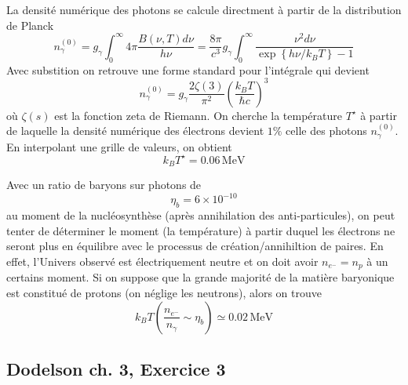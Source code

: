 \documentclass{article}
\numberwithin{equation}{section}
\begin{document}
La densité numérique des photons se calcule directment à partir de la distribution 
de Planck
\begin{equation}\label{eq:PlanckDensity} 
        n_\gamma^{(0)} = g_\gamma\int_0^{\infty}4\pi\frac{B(\nu, T) d\nu}{h\nu} = 
        \frac{8 \pi }{c^3} g_\gamma \int_0^{\infty } 
        \frac{\nu^2 d\nu}{\exp \left\{ h\nu / k_B T \right\} - 1}
\end{equation} 
Avec substition on retrouve une forme standard pour l'intégrale qui devient
\[
        n_\gamma^{(0)} = g_\gamma\frac{2\zeta(3 )}{\pi^2} \left( \frac{k_B T}{\hbar c} \right)^{3}
\]
où $\zeta(s)$ est la fonction zeta de Riemann.
On cherche la température $T^\star$ à partir de laquelle la densité numérique des électrons 
devient $1\%$ celle des photons $n_\gamma^{(0)}$. En interpolant une grille de valeurs, 
on obtient
\[
        \boxed{k_BT^\star = 0.06\, \text{MeV}}
\]

Avec un ratio de baryons sur photons de
\[
        \eta_b = 6 \times 10^{-10}
\]
au moment de la nucléosynthèse (après annihilation des anti-particules), on peut 
tenter de déterminer le moment (la température) à partir duquel les électrons 
ne seront plus en équilibre avec le processus de création/annihiltion de paires. En 
effet, l'Univers observé est électriquement neutre et on doit avoir $n_{e^{-}} = n_p$ 
à un certains moment. Si on suppose que la grande majorité de la matière baryonique 
est constitué de protons (on néglige les neutrons), alors on trouve
\[
        \boxed{k_B T( \frac{n_{e^{-}}}{n_\gamma} \sim \eta_b) \simeq 0.02\, \text{MeV}}
\]

\subsection{Dodelson ch. 3, Exercice 3}
\end{document}
